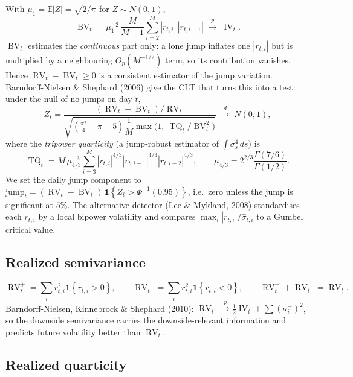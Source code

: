 \documentclass[11pt,a4paper]{article}
\newcommand{\E}{\mathbb{E}}
\newcommand{\Ind}[1]{\mathbf{1}\!\left\{#1\right\}}
\newcommand{\RV}{\operatorname{RV}}
\newcommand{\BV}{\operatorname{BV}}
\newcommand{\TQ}{\operatorname{TQ}}
\newcommand{\IV}{\operatorname{IV}}
\newcommand{\dto}{\xrightarrow{d}}
\newcommand{\pto}{\xrightarrow{p}}
\begin{document}
With $\mu_1 = \E|Z| = \sqrt{2/\pi}$ for $Z\sim N(0,1)$,
\begin{equation}
  \BV_t = \mu_1^{-2}\,\frac{M}{M-1}\sum_{i=2}^{M}|r_{t,i}|\,|r_{t,i-1}|
        \;\pto\; \IV_t .
\end{equation}
$\BV_t$ estimates the \emph{continuous} part only: a lone jump inflates one
$|r_{t,i}|$ but is multiplied by a neighbouring $O_p(M^{-1/2})$ term, so its
contribution vanishes. Hence $\RV_t-\BV_t \ge 0$ is a consistent estimator of
the jump variation. Barndorff-Nielsen \& Shephard (2006) give the CLT that
turns this into a test: under the null of no jumps on day $t$,
\begin{equation}
  Z_t = \frac{(\RV_t-\BV_t)/\RV_t}
             {\sqrt{\left(\tfrac{\pi^2}{4}+\pi-5\right)\dfrac1M
              \max\!\big(1,\ \TQ_t/\BV_t^2\big)}}
        \;\dto\; N(0,1),
\end{equation}
where the \emph{tripower quarticity} (a jump-robust estimator of
$\int\sigma_s^4\,ds$) is
\begin{equation}
  \TQ_t = M\,\mu_{4/3}^{-3}\sum_{i=3}^{M}
          |r_{t,i}|^{4/3}|r_{t,i-1}|^{4/3}|r_{t,i-2}|^{4/3},
  \qquad
  \mu_{4/3} = 2^{2/3}\frac{\Gamma(7/6)}{\Gamma(1/2)}.
\end{equation}
We set the daily jump component to
$\text{jump}_t = (\RV_t-\BV_t)\,\Ind{Z_t > \Phi^{-1}(0.95)}$, i.e.\ zero unless
the jump is significant at $5\%$. The alternative detector (Lee \& Mykland,
2008) standardises each $r_{t,i}$ by a local bipower volatility and compares
$\max_i |r_{t,i}|/\hat\sigma_{t,i}$ to a Gumbel critical value.

\subsection{Realized semivariance}

\begin{equation}
  \RV^{+}_t = \sum_i r_{t,i}^2\Ind{r_{t,i}>0},
  \qquad
  \RV^{-}_t = \sum_i r_{t,i}^2\Ind{r_{t,i}<0},
  \qquad
  \RV^{+}_t + \RV^{-}_t = \RV_t .
\end{equation}
Barndorff-Nielsen, Kinnebrock \& Shephard (2010): $\RV^{-}_t\pto\tfrac12\IV_t +
\sum(\kappa_i^{-})^2$, so the downside semivariance carries the
downside-relevant information and predicts future volatility better than
$\RV_t$.

\subsection{Realized quarticity}
\end{document}
